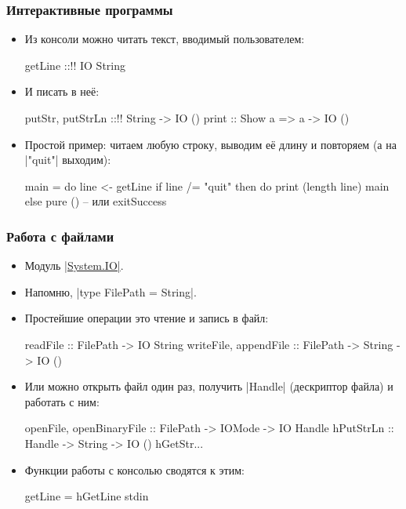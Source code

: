 \documentclass[11pt]{beamer}
\begin{document}
\begin{frame}[fragile]
  \frametitle{Интерактивные программы}
  \begin{itemize}
    \item Из консоли можно читать текст, вводимый пользователем:
          \begin{haskell}
            getLine ::!\pause! IO String
          \end{haskell}
    \item И писать в неё:
          \begin{haskell}
            putStr, putStrLn ::!\pause! String -> IO ()
            print :: Show a => a -> IO () 
          \end{haskell}
          \pause
    \item Простой пример: читаем любую строку, выводим её длину и повторяем (а на \haskinline|"quit"| выходим):
          \pause
          \begin{haskellsmall}
            main = do
              line <- getLine
              if line /= "quit"
                then do
                  print (length line)
                  main
                else
                  pure ()  -- или exitSuccess
          \end{haskellsmall}
  \end{itemize}
\end{frame}

\begin{frame}[fragile]
  \frametitle{Работа с файлами}
  \begin{itemize}
    \item Модуль \href{http://hackage.haskell.org/package/base/docs/System-IO.html}{\haskinline|System.IO|}.
    \item Напомню, \haskinline|type FilePath = String|.
    \item Простейшие операции это чтение и запись в файл:
          \begin{haskell}
            readFile :: FilePath -> IO String
            writeFile, appendFile :: 
              FilePath -> String -> IO ()
          \end{haskell}
    \item
          Или можно открыть файл один раз, получить \haskinline|Handle| (дескриптор файла) и работать с ним:
          \begin{haskell}
            openFile, openBinaryFile :: 
              FilePath -> IOMode -> IO Handle 
            hPutStrLn :: Handle -> String -> IO ()
            hGetStr...
          \end{haskell}
          \pause
    \item
          Функции работы с консолью сводятся к этим:
          \begin{haskell}
            getLine = hGetLine stdin
          \end{haskell}
  \end{itemize}
\end{frame}
\end{document}
